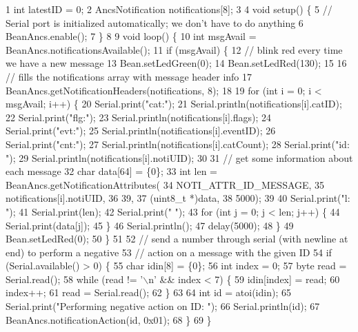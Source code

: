 \begin{DoxyCodeInclude}
1 int latestID = 0;
2 AncsNotification notifications[8];
3 
4 void setup() \{
5   // Serial port is initialized automatically; we don't have to do anything
6   BeanAncs.enable();
7 \}
8 
9 void loop() \{
10   int msgAvail = BeanAncs.notificationsAvailable();
11   if (msgAvail) \{
12     // blink red every time we have a new message
13     Bean.setLedGreen(0);
14     Bean.setLedRed(130);
15 
16     // fills the notifications array with message header info
17     BeanAncs.getNotificationHeaders(notifications, 8);
18 
19     for (int i = 0; i < msgAvail; i++) \{
20       Serial.print("cat:");
21       Serial.println(notifications[i].catID);
22       Serial.print("flg:");
23       Serial.println(notifications[i].flags);
24       Serial.print("evt:");
25       Serial.println(notifications[i].eventID);
26       Serial.print("cnt:");
27       Serial.println(notifications[i].catCount);
28       Serial.print("id: ");
29       Serial.println(notifications[i].notiUID);
30 
31       // get some information about each message
32       char data[64] = \{0\};
33       int len = BeanAncs.getNotificationAttributes(
34         NOTI\_ATTR\_ID\_MESSAGE,
35         notifications[i].notiUID,
36         39,
37         (uint8\_t *)data,
38         5000);
39 
40       Serial.print("l: ");
41       Serial.print(len);
42       Serial.print(" ");
43       for (int j = 0; j < len; j++) \{
44         Serial.print(data[j]);
45       \}
46       Serial.println();
47       delay(5000);
48     \}
49     Bean.setLedRed(0);
50   \}
51 
52   // send a number through serial (with newline at end) to perform a negative
53   // action on a message with the given ID
54   if (Serial.available() > 0) \{
55     char idin[8] = \{0\};
56     int index = 0;
57     byte read = Serial.read();
58     while (read != '\(\backslash\)n' && index < 7) \{
59       idin[index] = read;
60       index++;
61       read = Serial.read();
62     \}
63 
64     int id = atoi(idin);
65     Serial.print("Performing negative action on ID: ");
66     Serial.println(id);
67     BeanAncs.notificationAction(id, 0x01);
68   \}
69 \}
\end{DoxyCodeInclude}
 \hypertarget{class_bean_ancs_class_a8acff1decc559bc697e2757f5ebc12ee}{}
